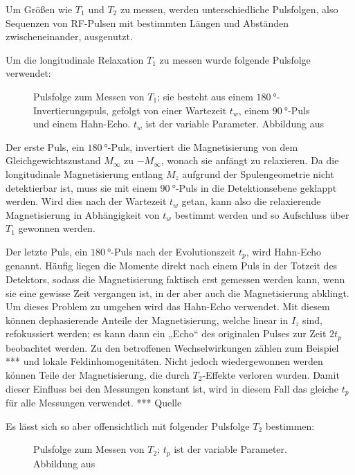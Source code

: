 Um Größen wie $T_1$ und $T_2$ zu messen, werden unterschiedliche Pulsfolgen, also Sequenzen von RF-Pulsen mit bestimmten Längen und Abständen zwischeneinander, ausgenutzt.

Um die longitudinale Relaxation $T_1$ zu messen wurde folgende Pulsfolge verwendet:
\begin{figure}
	\begin{center}
		
	\end{center}
    \caption{Pulsfolge zum Messen von $T_1$; sie besteht aus einem $\SI{180}{\degree}$-Invertierungspuls, gefolgt von einer Wartezeit $t_w$, einem $\SI{90}{\degree}$-Puls und einem Hahn-Echo. $t_w$ ist der variable Parameter. Abbildung aus \cite{joachim_master}}\label{fig:theo:pulsT1}
\end{figure}

Der erste Puls, ein $\SI{180}{\degree}$-Puls, invertiert die Magnetisierung von dem Gleichgewichtszustand $M_\infty$ zu $-M_\infty$, wonach sie anfängt zu relaxieren. Da die longitudinale Magnetisierung entlang $M_z$ aufgrund der Spulengeometrie nicht detektierbar ist, muss sie mit einem $\SI{90}{\degree}$-Puls in die Detektionsebene geklappt werden. Wird dies nach der Wartezeit $t_w$ getan, kann also die relaxierende Magnetisierung in Abhängigkeit von $t_w$ bestimmt werden und so Aufschluss über $T_1$ gewonnen werden.

Der letzte Puls, ein $\SI{180}{\degree}$-Puls nach der Evolutionszeit $t_p$, wird Hahn-Echo genannt. Häufig liegen die Momente direkt nach einem Puls in der Totzeit des Detektors, sodass die Magnetisierung faktisch erst gemessen werden kann, wenn sie eine gewisse Zeit vergangen ist, in der aber auch die Magnetisierung abklingt. Um dieses Problem zu umgehen wird das Hahn-Echo verwendet. Mit diesem können dephasierende Anteile der Magnetisierung, welche linear in $I_z$ sind, refokussiert werden; es kann dann ein „Echo“ des originalen Pulses zur Zeit $2 t_p$ beobachtet werden. Zu den betroffenen Wechselwirkungen zählen zum Beispiel *** und lokale Feldinhomogenitäten. Nicht jedoch wiedergewonnen werden können Teile der Magnetisierung, die durch $T_2$-Effekte verloren wurden. Damit dieser Einfluss bei den Messungen konstant ist, wird in diesem Fall das gleiche $t_p$ für alle Messungen verwendet. *** Quelle

Es lässt sich so aber offensichtlich mit folgender Pulsfolge $T_2$ bestimmen:
\begin{figure}
	\begin{center}
		
	\end{center}
	\caption{Pulsfolge zum Messen von $T_2$; $t_p$ ist der variable Parameter. Abbildung aus \cite{joachim_master}}\label{fig:theo:pulsT2}
\end{figure}

